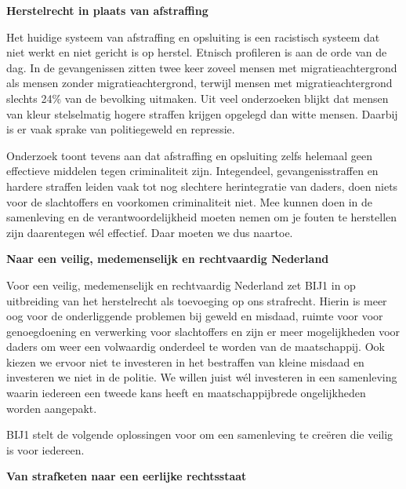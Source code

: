 \textbf{Herstelrecht in plaats van afstraffing}

Het huidige systeem van afstraffing en opsluiting is een racistisch
systeem dat niet werkt en niet gericht is op herstel. Etnisch profileren
is aan de orde van de dag. In de gevangenissen zitten twee keer zoveel
mensen met migratieachtergrond als mensen zonder migratieachtergrond,
terwijl mensen met migratieachtergrond slechts 24\% van de bevolking
uitmaken. Uit veel onderzoeken blijkt dat mensen van kleur stelselmatig
hogere straffen krijgen opgelegd dan witte mensen. Daarbij is er vaak
sprake van politiegeweld en repressie.

Onderzoek toont tevens aan dat afstraffing en opsluiting zelfs helemaal
geen effectieve middelen tegen criminaliteit zijn. Integendeel,
gevangenisstraffen en hardere straffen leiden vaak tot nog slechtere
herintegratie van daders, doen niets voor de slachtoffers en voorkomen
criminaliteit niet. Mee kunnen doen in de samenleving en de
verantwoordelijkheid moeten nemen om je fouten te herstellen zijn
daarentegen wél effectief. Daar moeten we dus naartoe.

\textbf{Naar een veilig, medemenselijk en rechtvaardig Nederland}

Voor een veilig, medemenselijk en rechtvaardig Nederland zet BIJ1 in op
uitbreiding van het herstelrecht als toevoeging op ons strafrecht.
Hierin is meer oog voor de onderliggende problemen bij geweld en
misdaad, ruimte voor voor genoegdoening en verwerking voor slachtoffers
en zijn er meer mogelijkheden voor daders om weer een volwaardig
onderdeel te worden van de maatschappij. Ook kiezen we ervoor niet te
investeren in het bestraffen van kleine misdaad en investeren we niet in
de politie. We willen juist wél investeren in een samenleving waarin
iedereen een tweede kans heeft en maatschappijbrede ongelijkheden worden
aangepakt.

BIJ1 stelt de volgende oplossingen voor om een samenleving te creëren
die veilig is voor iedereen.

\textbf{Van strafketen naar een eerlijke rechtsstaat}

